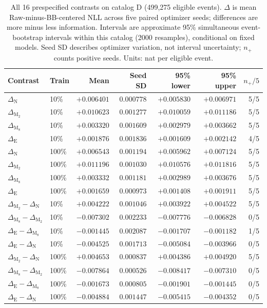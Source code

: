 \begin{table}[!htbp]
\centering
\normalsize
\setlength{\tabcolsep}{3pt}
\caption{All 16 prespecified contrasts on catalog D (499,275 eligible events). $\Delta$ is mean Raw-minus-BB-centered NLL across five paired optimizer seeds; differences are more minus less information. Intervals are approximate 95\% simultaneous event-bootstrap intervals within this catalog (2000 resamples), conditional on fixed models. Seed SD describes optimizer variation, not interval uncertainty; $n_+$ counts positive seeds. Units: nat per eligible event.}
\label{tab:information-D-primary16}
\begin{tabular}{llrrrrr}
\toprule
Contrast & Train & Mean & Seed SD & 95\% lower & 95\% upper & $n_+/5$ \\
\midrule
$\Delta_{\mathrm{N}}$ & 10\% & $+0.006401$ & $0.000778$ & $+0.005830$ & $+0.006971$ & 5/5 \\
$\Delta_{\mathrm{M_2}}$ & 10\% & $+0.010623$ & $0.001277$ & $+0.010059$ & $+0.011186$ & 5/5 \\
$\Delta_{\mathrm{M_8}}$ & 10\% & $+0.003320$ & $0.001609$ & $+0.002979$ & $+0.003662$ & 5/5 \\
$\Delta_{\mathrm{E}}$ & 10\% & $+0.001876$ & $0.001836$ & $+0.001609$ & $+0.002142$ & 4/5 \\
\midrule
$\Delta_{\mathrm{N}}$ & 100\% & $+0.006543$ & $0.001194$ & $+0.005962$ & $+0.007124$ & 5/5 \\
$\Delta_{\mathrm{M_2}}$ & 100\% & $+0.011196$ & $0.001030$ & $+0.010576$ & $+0.011816$ & 5/5 \\
$\Delta_{\mathrm{M_8}}$ & 100\% & $+0.003332$ & $0.001181$ & $+0.002989$ & $+0.003676$ & 5/5 \\
$\Delta_{\mathrm{E}}$ & 100\% & $+0.001659$ & $0.000973$ & $+0.001408$ & $+0.001911$ & 5/5 \\
\midrule
$\Delta_{\mathrm{M_2}}-\Delta_{\mathrm{N}}$ & 10\% & $+0.004222$ & $0.001046$ & $+0.003922$ & $+0.004522$ & 5/5 \\
$\Delta_{\mathrm{M_8}}-\Delta_{\mathrm{M_2}}$ & 10\% & $-0.007302$ & $0.002233$ & $-0.007776$ & $-0.006828$ & 0/5 \\
$\Delta_{\mathrm{E}}-\Delta_{\mathrm{M_8}}$ & 10\% & $-0.001445$ & $0.002087$ & $-0.001707$ & $-0.001182$ & 1/5 \\
$\Delta_{\mathrm{E}}-\Delta_{\mathrm{N}}$ & 10\% & $-0.004525$ & $0.001713$ & $-0.005084$ & $-0.003966$ & 0/5 \\
\midrule
$\Delta_{\mathrm{M_2}}-\Delta_{\mathrm{N}}$ & 100\% & $+0.004653$ & $0.000837$ & $+0.004386$ & $+0.004920$ & 5/5 \\
$\Delta_{\mathrm{M_8}}-\Delta_{\mathrm{M_2}}$ & 100\% & $-0.007864$ & $0.000526$ & $-0.008417$ & $-0.007310$ & 0/5 \\
$\Delta_{\mathrm{E}}-\Delta_{\mathrm{M_8}}$ & 100\% & $-0.001673$ & $0.000805$ & $-0.001901$ & $-0.001445$ & 0/5 \\
$\Delta_{\mathrm{E}}-\Delta_{\mathrm{N}}$ & 100\% & $-0.004884$ & $0.001447$ & $-0.005415$ & $-0.004352$ & 0/5 \\
\bottomrule
\end{tabular}
\end{table}
